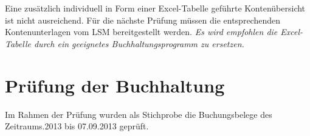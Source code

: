 \documentclass[%
	titlepage,oneside,12pt,headlines=1.5,numbers=noenddot, chapterprefix=false,parskip=full-,DIV=14,pagesize]{scrreprt}
\begin{document}
Eine zusätzlich individuell in Form einer Excel-Tabelle geführte Kontenübersicht ist nicht ausreichend. Für die nächste Prüfung müssen die entsprechenden Kontenunterlagen vom LSM bereitgestellt werden. \textit{Es wird empfohlen die Excel-Tabelle durch ein geeignetes Buchhaltungsprogramm zu ersetzen.} 






\section{Prüfung der Buchhaltung}
Im Rahmen der Prüfung wurden als Stichprobe die Buchungsbelege des Zeitraums.2013 bis 07.09.2013 geprüft.
\end{document}

